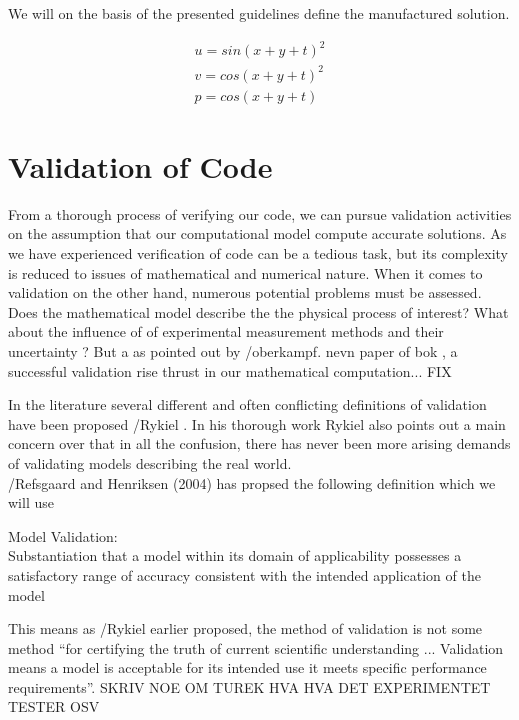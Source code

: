 We will on the basis of the presented guidelines define the manufactured solution.

\begin{align*}
u = sin(x + y + t)^2 \\
v = cos(x + y +  t)^2 \\
p = cos(x + y + t)
\end{align*}

\newpage                                                                                                                                             
\section{Validation of Code}
From a thorough process of verifying our code, we can pursue validation activities on the assumption that our computational model compute accurate solutions. As we have experienced verification of code can be a tedious task, but its complexity is reduced to issues of mathematical and numerical nature. When it comes to validation on the other hand, numerous potential problems must be assessed.  Does the mathematical model describe the the physical process of interest? What about the influence of of experimental measurement methods and their uncertainty ? But a as pointed out by /oberkampf. nevn paper of bok , a  successful validation rise thrust in our mathematical computation... FIX

In the literature several different and often conflicting definitions of validation have been proposed /Rykiel . In his thorough work Rykiel also points out a main concern over that in all the confusion, there has never been more arising demands of validating models describing the real world. \\

/Refsgaard and Henriksen (2004) has propsed the following definition which we will use  

\begin{defn} 
Model Validation: \\Substantiation that a model within its domain of applicability possesses a satisfactory range of accuracy consistent with the intended application of the model
\end{defn}

This means as /Rykiel earlier proposed, the method of validation is not some method ``for certifying the truth of current scientific understanding ... Validation means a model is acceptable for its intended use it meets specific performance requirements''.  SKRIV NOE OM TUREK HVA HVA DET EXPERIMENTET TESTER OSV

 

